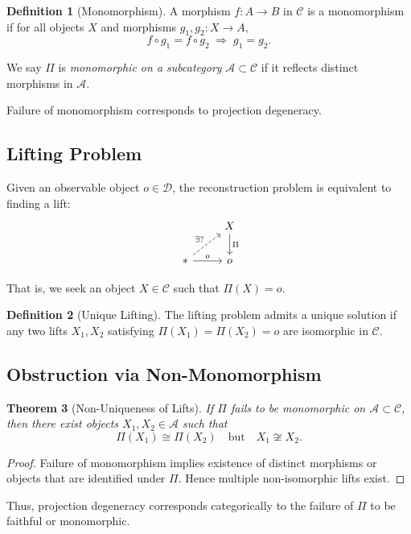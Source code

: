\documentclass[12pt, oneside]{article}
\theoremstyle{plain}
\newtheorem{theorem}{Theorem}[section]
\theoremstyle{definition}
\newtheorem{definition}[theorem]{Definition}
\theoremstyle{remark}
\begin{document}
\begin{definition}[Monomorphism]
A morphism $f : A \to B$ in $\mathcal{C}$ is a monomorphism if for all objects $X$ and morphisms $g_1, g_2 : X \to A$,
\[
f \circ g_1 = f \circ g_2 \;\Rightarrow\; g_1 = g_2.
\]
\end{definition}

We say $\Pi$ is \emph{monomorphic on a subcategory} $\mathcal{A} \subset \mathcal{C}$ if it reflects distinct morphisms in $\mathcal{A}$.

Failure of monomorphism corresponds to projection degeneracy.

\subsection{Lifting Problem}

Given an observable object $o \in \mathcal{D}$, the reconstruction problem is equivalent to finding a lift:
\[
\begin{tikzcd}
& X \arrow[d, "\Pi"] \\
\ast \arrow[r, "o"] \arrow[ru, dashed, "\exists ?"] & o
\end{tikzcd}
\]

That is, we seek an object $X \in \mathcal{C}$ such that $\Pi(X) = o$.

\begin{definition}[Unique Lifting]
The lifting problem admits a unique solution if any two lifts $X_1, X_2$ satisfying $\Pi(X_1) = \Pi(X_2) = o$ are isomorphic in $\mathcal{C}$.
\end{definition}

\subsection{Obstruction via Non-Monomorphism}

\begin{theorem}[Non-Uniqueness of Lifts]
If $\Pi$ fails to be monomorphic on $\mathcal{A} \subset \mathcal{C}$, then there exist objects $X_1, X_2 \in \mathcal{A}$ such that
\[
\Pi(X_1) \cong \Pi(X_2) \quad \text{but} \quad X_1 \not\cong X_2.
\]
\end{theorem}

\begin{proof}
Failure of monomorphism implies existence of distinct morphisms or objects that are identified under $\Pi$. Hence multiple non-isomorphic lifts exist.
\end{proof}

Thus, projection degeneracy corresponds categorically to the failure of $\Pi$ to be faithful or monomorphic.
\end{document}
